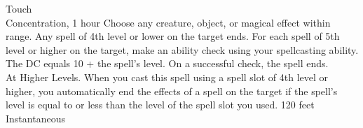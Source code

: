 \documentclass{article}
\begin{document}
    {Touch\\Concentration, 1 hour}%
    {Choose any creature, object, or magical effect within range. Any spell of 4th level or lower on the target ends. For each spell of 5th level or higher on the target, make an ability check using your spellcasting ability. The DC equals 10 + the spell’s level. On a successful check, the spell ends.
    \\[1mm]
    At Higher Levels. When you cast this spell using a spell slot of 4th level or higher, you automatically end the effects of a spell on the target if the spell’s level is equal to or less than the level of the spell slot you used.}
    {120 feet\\Instantaneous}%
    
\removespace
\end{document}
